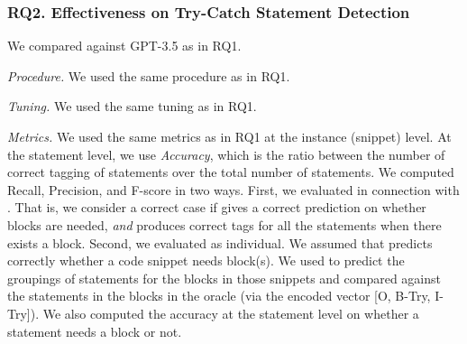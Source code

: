 \subsubsection{RQ2. Effectiveness on Try-Catch Statement Detection}
 We compared {\xstate} against GPT-3.5 as in RQ1.


{\em Procedure.} We used the same procedure as in RQ1.

{\em Tuning.} We used the same tuning as in RQ1.

{\em Metrics.} We used the same metrics as in RQ1 at the instance (snippet)
level.  At the statement level, we use {\em Accuracy}, which is the
ratio between the number of correct tagging of statements over the
total number of statements. We computed Recall, Precision,
and F-score in two ways. First, we evaluated {\xstate} in connection
with {\xblock}. That is, we consider a correct case if {\xblock} gives
a correct prediction on whether
 blocks are needed, {\em and} {\xstate} produces
correct tags for all the statements when there exists
a  block. Second, we evaluated {\xstate} as
individual. We assumed that {\xblock} predicts correctly whether a
code snippet needs  block(s). We used {\xstate} to
predict the groupings of statements for the blocks in those snippets
and compared against the statements in the blocks in the oracle (via
the encoded vector [O, B-Try, I-Try]). We also computed the accuracy
at the statement level on whether a statement needs a 
block or not.



